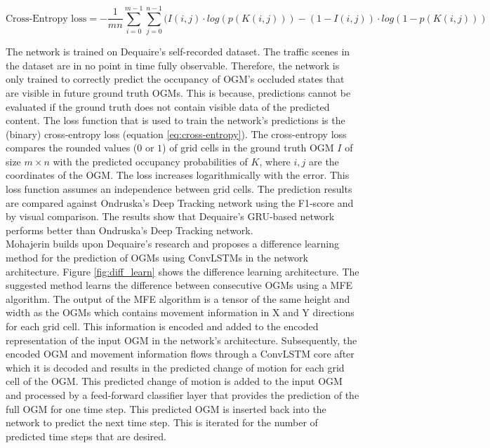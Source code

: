 \begin{equation} \label{eq:cross-entropy}
	\text{Cross-Entropy loss} = -\frac{1}{mn}\sum_{i=0}^{m-1}\sum_{j=0}^{n-1}(I(i,j)\cdot log(p(K(i,j)))-(1-I(i,j))\cdot log(1-p(K(i,j)))
\end{equation}

The network is trained on Dequaire's \cite{dequaire2018deep} self-recorded dataset. The traffic scenes in the dataset are in no point in time fully observable. Therefore, the network is only trained to correctly predict the occupancy of \gls{OGM}'s occluded states that are visible in future ground truth \glspl{OGM}. This is because, predictions cannot be evaluated if the ground truth does not contain visible data of the predicted content. The loss function that is used to train the network's predictions is the (binary) cross-entropy loss (equation \ref{eq:cross-entropy}). The cross-entropy loss compares the rounded values ($0$ or $1$) of grid cells in the ground truth \gls{OGM} $I$ of size $m \times n$ with the predicted occupancy probabilities of $K$, where $i, j$ are the coordinates of the \gls{OGM}. The loss increases logarithmically with the error. This loss function assumes an independence between grid cells. The prediction results are compared against Ondruska's \cite{ondruska2016deep} Deep Tracking network using the F1-score and by visual comparison. The results show that Dequaire's \cite{dequaire2018deep} \gls{GRU}-based network performs better than Ondruska's \cite{ondruska2016deep} Deep Tracking network.  \\  

Mohajerin \cite{mohajerin2019multi} builds upon Dequaire's \cite{dequaire2018deep} research and proposes a difference learning method for the prediction of \glspl{OGM} using \glspl{ConvLSTM} in the network architecture. Figure \ref{fig:diff_learn} shows the difference learning architecture. The suggested method learns the difference between consecutive \glspl{OGM} using a \gls{MFE} algorithm. The output of the \gls{MFE} algorithm is a tensor of the same height and width as the \glspl{OGM} which contains movement information in X and Y directions for each grid cell. This information is encoded and added to the encoded representation of the input \gls{OGM} in the network's architecture. Subsequently, the encoded \gls{OGM} and movement information flows through a \gls{ConvLSTM} core after which it is decoded and results in the predicted change of motion for each grid cell of the \gls{OGM}. This predicted change of motion is added to the input \gls{OGM} and processed by a feed-forward classifier layer that provides the prediction of the full \gls{OGM} for one time step. This predicted \gls{OGM} is inserted back into the network to predict the next time step. This is iterated for the number of predicted time steps that are desired. \\

